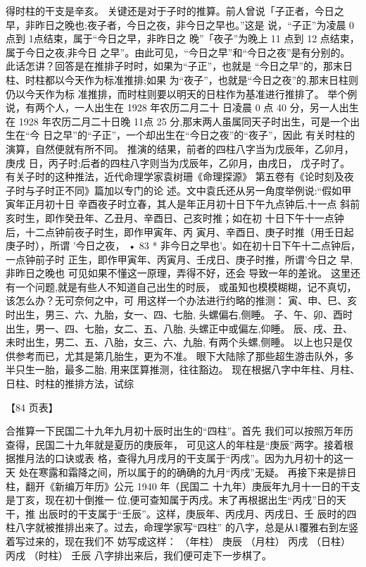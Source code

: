 得时柱的干支是辛亥。
关键还是对于子时的推算。前人曾说「子正者，今日之
早，非昨日之晚也;夜子者，今日之夜，非今日之早也。”这是
说，“子正”为凌晨 0 点到 1点结束，属于“今日之早，非昨日之
晚”「夜子”为晚上 11 点到 12 点结束，属于今日之夜,非今日
之早”。由此可见，“今日之早”和“今日之夜”是有分别的。
此话怎讲？回答是在推排子时时，如果为“子正”，也就是
“今日之早”的，那末日柱、时柱都以今天作为标准推排;如果
为“夜子”，也就是“今日之夜”的,那末日柱则仍以今天作为标
准推排，而时柱则要以明天的日柱作为基准进行推排了。
举个例说，有两个人，一人出生在 1928 年农历二月二十
日凌晨 0 点 40 分，另一人出生在 1928 年农历二月二十日晚
11点 25 分,那末两人虽属同天子时出生，可是一个出生在“今
日之早”的“子正”，一个却出生在“今日之夜”的“夜子”，因此
有关时柱的演算，自然便就有所不同。
推演的结果，前者的四柱八字当为戊辰年，乙卯月，庚戌
日，丙子时;后者的四柱八字则当为戊辰年，乙卯月，由戌日，
戊子时了。
有关子时的这种推法，近代命理学家袁树珊《命理探源》
第五卷有《论时刻及夜子时与子时正不同》篇加以专门的论
述。文中袁氏还从另一角度举例说:“假如甲寅年正月初十日
辛酉夜子时立春，其人是年正月初十日下午九点钟后,十一点
斜前亥时生，即作癸丑年、乙丑月、辛酉日、己亥时推；如在初
十日下午十一点钟后，十二点钟前夜子时生，即作甲寅年、丙
寅月、辛酉日、庚子时推（用壬日起庚子时），所谓 '今日之夜，
• 83 *
非今日之早也'。如在初十日下午十二点钟后，一点钟前子时
正生，即作甲寅年、丙寅月、壬戌日、庚子时推，所谓'今日之
早,非昨日之晚也 可见如果不懂这一原理，弄得不好，还会
导致一年的差讹。
这里还有一个问题,就是有些人不知道自己出生的时辰，
或虽知也模模糊糊，记不真切，该怎么办？无可奈何之中，可
用这样一个办法进行约略的推测：
寅、申、巳、亥时出生，男三、六、九胎，女一、四、七胎,
头螺偏右,侧睡。
子、午、卯、酉时出生，男一、四、七胎，女二、五、八胎,
头螺正中或偏左,仰睡。
辰、戌、丑、未时出生，男二、五、八胎，女三、六、九胎,
有两个头螺,侧睡。
以上也只是仅供参考而已，尤其是第几胎生，更为不准。
眼下大陆除了那些超生游击队外，多半只生一胎，最多二胎,
用来匡算推测，往往豁边。
现在根据八字中年柱、月柱、日柱、时柱的推排方法，试综

【84 页表】

合推算一下民国二十九年九月初十辰时出生的“四柱”。首先
我们可以按照万年历查得，民国二十九年就是夏历的庚辰年，
可见这人的年柱是“庚辰”两字。接着根据推月法的口诀或表
格，查得九月戌月的干支属于“丙戌”。因为九月初十的这一天
处在寒露和霜降之间，所以属于的的确确的九月“丙戌”无疑。
再接下来是排日柱，翻开《新编万年历》公元 1940 年（民国二
十九年）庚辰年九月十一日的干支是丁亥，现在初十倒推一
位,便可查知属于丙戌。末了再根据出生“丙戌”日的天干，推
出辰时的干支属于“壬辰”。这样，庚辰年、丙戌月、丙戌日、壬
辰时的四柱八字就被推排出来了。过去，命理学家写“四柱”
的八字，总是从1覆雅右到左竖着写过来的，现在我们不
妨写成这样：
（年柱） 庚辰
（月柱） 丙戌
（日柱） 丙戌
（时柱） 壬辰
八字排出来后，我们便可走下一步棋了。

